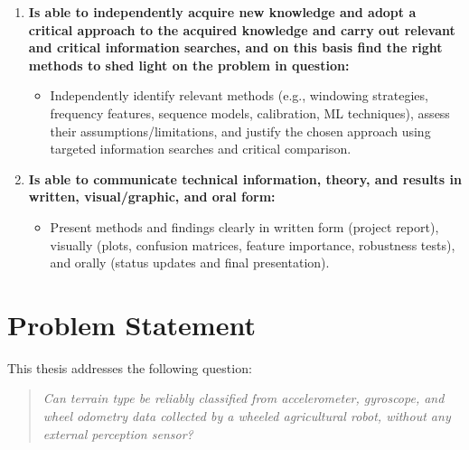 \begin{enumerate}
    \item \textbf{Is able to independently acquire new knowledge and adopt a critical approach to the acquired knowledge and carry out relevant and critical information searches, and on this basis find the right methods to shed light on the problem in question:} 
    \begin{itemize}
        \item Independently identify relevant methods (e.g., windowing strategies, frequency features, sequence models, calibration, ML techniques), assess their assumptions/limitations, and justify the chosen approach using targeted information searches and critical comparison.
    \end{itemize}

    \item \textbf{Is able to communicate technical information, theory, and results in written, visual/graphic, and oral form:} 
    \begin{itemize}
        \item Present methods and findings clearly in written form (project report), visually (plots, confusion matrices, feature importance, robustness tests), and orally (status updates and final presentation).
    \end{itemize}
\end{enumerate}




\newpage
\section{Problem Statement}

This thesis addresses the following question:

\begin{quote}
\emph{Can terrain type be reliably classified from accelerometer, gyroscope, and wheel odometry data collected by a wheeled agricultural robot, without any external perception sensor?}
\end{quote}

